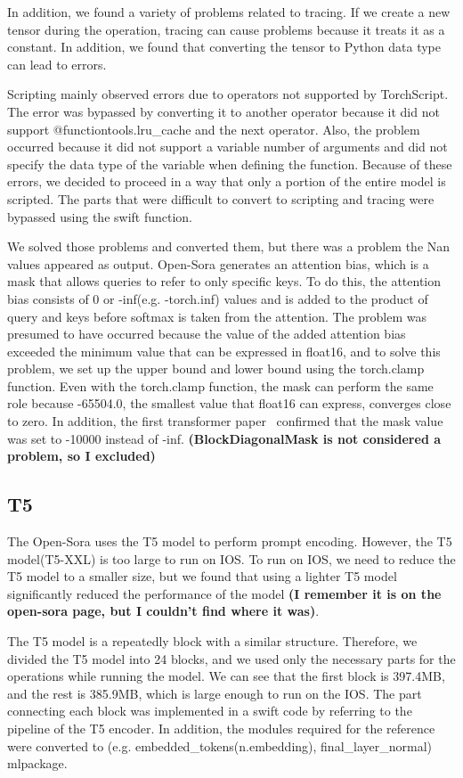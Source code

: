 In addition, we found a variety of problems related to tracing. If we create a new tensor during the operation, tracing can cause problems because it treats it as a constant. In addition, we found that converting the tensor to Python data type can lead to errors.

Scripting mainly observed errors due to operators not supported by TorchScript. The error was bypassed by converting it to another operator because it did not support @functiontools.lru\_cache and the next operator. Also, the problem occurred because it did not support a variable number of arguments and did not specify the data type of the variable when defining the function. Because of these errors, we decided to proceed in a way that only a portion of the entire model is scripted. The parts that were difficult to convert to scripting and tracing were bypassed using the swift function.

We solved those problems and converted them, but there was a problem the Nan values appeared as output. Open-Sora generates an attention bias, which is a mask that allows queries to refer to only specific keys. To do this, the attention bias consists of 0 or -inf(e.g. -torch.inf) values and is added to the product of query and keys before softmax is taken from the attention. The problem was presumed to have occurred because the value of the added attention bias exceeded the minimum value that can be expressed in float16, and to solve this problem, we set up the upper bound and lower bound using the torch.clamp function. Even with the torch.clamp function, the mask can perform the same role because -65504.0, the smallest value that float16 can express, converges close to zero. In addition, the first transformer paper~\cite{vaswani2017attention} confirmed that the mask value was set to -10000 instead of -inf. \textbf{(BlockDiagonalMask is not considered a problem, so I excluded)}

\subsection{T5}
The Open-Sora uses the T5 model to perform prompt encoding. However, the T5 model(T5-XXL) is too large to run on IOS. To run on IOS, we need to reduce the T5 model to a smaller size, but we found that using a lighter T5 model significantly reduced the performance of the model \textbf{(I remember it is on the open-sora page, but I couldn't find where it was)}.
\bonote{}

The T5 model is a repeatedly  block with a similar structure.  Therefore, we divided the T5 model into 24 blocks, and we used only the necessary parts for the operations while running the model. We can see that the first block is 397.4MB, and the rest is 385.9MB, which is large enough to run on the IOS. The part connecting each block was implemented in a swift code by referring to the pipeline of the T5 encoder. In addition, the modules required for the reference were converted to (e.g. embedded\_tokens(n.embedding), final\_layer\_normal) mlpackage.

